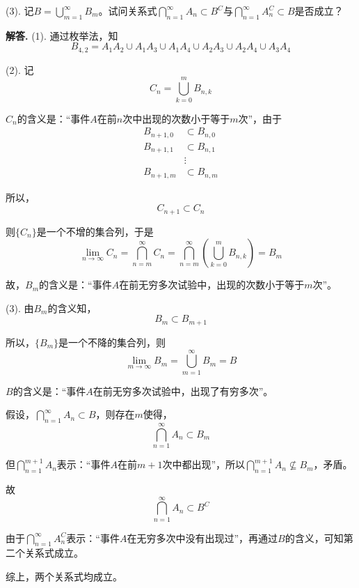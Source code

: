 \documentclass[12pt, a4paper, oneside]{ctexart}
\newenvironment{solution}{\par\noindent\textbf{解答. }}{\bigskip\par}
\begin{document}
(3). 记$B=\bigcup_{m=1}^{\infty}B_m$。试问关系式$\bigcap_{n=1}^{\infty}A_n\subset B^C$与$\bigcap_{n=1}^{\infty}A_n^C\subset B$是否成立？
\begin{solution}
   (1). 通过枚举法，知
   \begin{equation*}
       B_{4,2}=A_1A_2\cup A_1A_3\cup A_1A_4\cup A_2A_3\cup A_2A_4\cup A_3A_4
   \end{equation*} 

   (2). 记
   \begin{equation*}
       C_n = \bigcup_{k=0}^mB_{n, k}
   \end{equation*}

   $C_n$的含义是：“事件$A$在前$n$次中出现的次数小于等于$m$次”，由于
   \begin{equation*}
       \begin{aligned}
           B_{n+1,0}&\subset B_{n,0}\\
           B_{n+1,1}&\subset B_{n,1}\\
           &\vdots\\
           B_{n+1,m}&\subset B_{n, m}
       \end{aligned}
   \end{equation*}

   所以，
   \begin{equation*}
       C_{n+1}\subset C_n
   \end{equation*}

   则$\{C_n\}$是一个不增的集合列，于是
   \begin{equation*}
       \lim_{n\rightarrow\infty}C_n = \bigcap_{n=m}^{\infty}C_n = \bigcap_{n=m}^{\infty}\left(\bigcup_{k=0}^mB_{n, k}\right) = B_m
   \end{equation*}

   故，$B_m$的含义是：“事件$A$在前无穷多次试验中，出现的次数小于等于$m$次”。

   (3). 由$B_m$的含义知，
   \begin{equation*}
       B_m\subset B_{m+1}
   \end{equation*}

   所以，$\{B_m\}$是一个不降的集合列，则
   \begin{equation*}
       \lim_{m\rightarrow\infty}B_m = \bigcup_{m=1}^{\infty}B_m = B
   \end{equation*}

   $B$的含义是：“事件$A$在前无穷多次试验中，出现了有穷多次”。
   
   假设，$\bigcap_{n=1}^{\infty}A_n\subset B$，则存在$m$使得，
   \begin{equation*}
       \bigcap_{n=1}^{\infty}A_n\subset B_m
   \end{equation*}

   但$\bigcap_{n=1}^{m+1}A_n$表示：“事件$A$在前$m+1$次中都出现”，所以$\bigcap_{n=1}^{m+1}A_n\nsubseteq B_m$，矛盾。
   
   故
   \begin{equation*}
       \bigcap_{n=1}^{\infty}A_n\subset B^C
   \end{equation*}

   由于$\bigcap_{n=1}^{\infty}A_n^C$表示：“事件$A$在无穷多次中没有出现过”，再通过$B$的含义，可知第二个关系式成立。

   综上，两个关系式均成立。
\end{solution}
\end{document}
